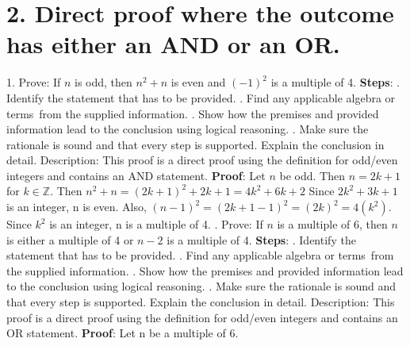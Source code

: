 \documentclass{article}
\begin{document}
\section*{2. Direct proof where the outcome has either an AND or an OR.}
1. Prove: If \(n\) is odd, then \(n^2 + n\) is even and \(( - 1)^2\) is a multiple of 4.
\newline \textbf{Steps}: . Identify the statement that has to be provided.
. Find any applicable algebra or terms from the supplied information.
. Show how the premises and provided information lead to the conclusion using logical reasoning.
. Make sure the rationale is sound and that every step is supported.
Explain the conclusion in detail.
\newline Description: This proof is a direct proof using the definition for odd/even integers and contains an AND statement.
\textbf{Proof}: Let \(n\) be odd.
\newline
Then \(n = 2k + 1\) for \(k \in \mathbb{Z}\).
\newline
Then \(n^2 + n = (2k + 1)^2 + 2k + 1 = 4k^2 + 6k + 2\)
\newline
Since \(2k^2 + 3k + 1\) is an integer, n is even.
Also, \((n - 1)^2 = (2k + 1 - 1)^2 = (2k)^2 = 4(k^2)\).
Since \(k^2\) is an integer, n is a multiple of 4.
\newline
{}. Prove: If \(n\) is a multiple of 6, then \(n\) is either a multiple of 4 or  \(n - 2\) is a multiple of 4.
\newline \textbf{Steps}: . Identify the statement that has to be provided.
. Find any applicable algebra or terms from the supplied information.
. Show how the premises and provided information lead to the conclusion using logical reasoning.
. Make sure the rationale is sound and that every step is supported.
Explain the conclusion in detail.
\newline Description: This proof is a direct proof using the definition for odd/even integers and contains an OR statement.
\newline
\textbf{Proof}: Let n be a multiple of 6.
\newline
\end{document}
